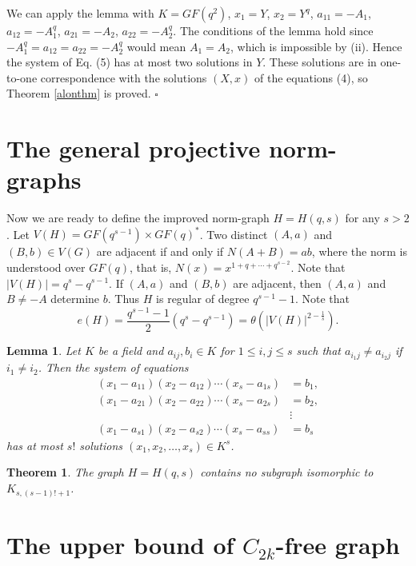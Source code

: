 \documentclass[12pt]{article}
\newtheorem{lemma}{Lemma}
\newtheorem{theorem}{Theorem}
\begin{document}
			We can apply the lemma with $K=GF(q^2)$, $ x_1 = Y $, $ x_2 = Y^q $, $ a_{11} = -A_1 $, $ a_{12} = -A_1^q $, $ a_{21} = -A_2 $, $ a_{22} = -A_2^q $. The conditions of the lemma hold since $ -A_1^q = a_{12} = a_{22} = -A_2^q $ would mean $ A_1 = A_2 $, which is impossible by (ii). Hence the system of Eq. (5) has at most two solutions in $ Y $. These solutions are in one-to-one correspondence with the solutions $ (X, x) $ of the equations (4), so Theorem \ref{alonthm} is proved. \hfill$\square$
\section{The general projective norm-graphs}
Now we are ready to define the improved norm-graph $ H = H(q, s) $ for any $ s > 2 $. Let $ V(H) = GF(q^{s-1}) \times GF(q)^* $. Two distinct $ (A, a) $ and $ (B, b) \in V(G) $ are adjacent if and only if $ N(A + B) = ab $, where the norm is understood over $ GF(q) $, that is, $ N(x) = x^{1 + q + \cdots + q^{s-2}} $. Note that $ |V(H)| = q^s - q^{s - 1} $. If $ (A, a) $ and $ (B, b) $ are adjacent, then $ (A, a) $ and $ B \neq -A $ determine $ b $. Thus $ H $ is regular of degree $ q^{s - 1} - 1 $. Note that 
\[e(H)=\frac{q^{s - 1} - 1}{2}(q^s - q^{s - 1})=\theta(|V(H)|^{2-\tfrac{1}{s}}).\]

\begin{lemma}
	Let $ K $ be a field and $ a_{ij}, b_i \in K $ for $ 1 \leq i, j \leq s $ such that $ a_{i_1j} \neq a_{i_2j} $ if $ i_1 \neq i_2 $. Then the system of equations
	\[\begin{aligned}
		(x_1 - a_{11})(x_2 - a_{12}) \cdots (x_s - a_{1s}) &= b_1, \\
		(x_1 - a_{21})(x_2 - a_{22}) \cdots (x_s - a_{2s}) &= b_2, \\
		&\vdots \\
		(x_1 - a_{s1})(x_2 - a_{s2}) \cdots (x_s - a_{ss}) &= b_s
	\end{aligned}\]
	has at most $ s! $ solutions $ (x_1, x_2, \ldots, x_s) \in K^s $.
\end{lemma}
\begin{theorem}
	The graph $ H = H(q, s) $ contains no subgraph isomorphic to $ K_{s, (s - 1)! + 1} $.
\end{theorem}
\section{The upper bound of $C_{2k}$-free graph}
\end{document}
